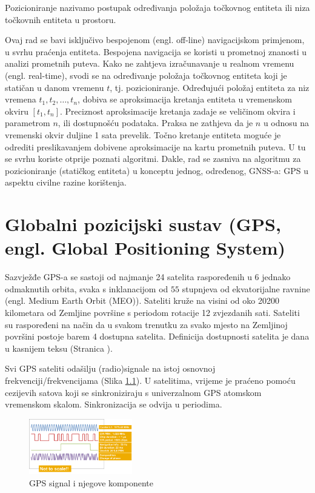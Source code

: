 \documentclass[a4paper,twoside,12pt]{memoir} %
\begin{document}
\begin{intro}
	\begin{defn}[Pozicioniranje]
		Pozicioniranje nazivamo postupak određivanja položaja točkovnog entiteta ili niza 
		točkovnih entiteta u prostoru.
	\end{defn}
	Ovaj rad se bavi isključivo bespojenom (engl. off-line) navigacijskom primjenom, u svrhu praćenja entiteta.
	Bespojena navigacija se koristi u prometnoj znanosti u analizi prometnih puteva. Kako ne zahtjeva izračunavanje u realnom vremenu (engl. real-time),
	svodi se na određivanje položaja točkovnog entiteta koji je statičan u danom vremenu $t$, tj. pozicioniranje.
	Određujući položaj entiteta za niz vremena $ t_1,t_2, \hdots ,t_n $, dobiva se 
	aproksimacija kretanja entiteta u vremenskom okviru $[t_1,t_n]$.
	Preciznost aproksimacije kretanja zadaje se veličinom okvira i parametrom $n$, ili dostupnošću podataka.
	Praksa ne zathjeva da je $n$ u odnosu na vremenski okvir duljine 1 sata prevelik.
	Točno kretanje entiteta moguće je
	odrediti preslikavanjem dobivene aproksimacije na kartu prometnih puteva.
	U tu se svrhu koriste otprije poznati algoritmi.
	Dakle, rad se zasniva na algoritmu za pozicioniranje (statičkog entiteta)
	u konceptu jednog, određenog, GNSS-a: GPS u aspektu civilne razine korištenja.
	
\end{intro}
	
\chapter[Globalni pozicijski sustav (GPS)][GPS]{Globalni pozicijski sustav (GPS, engl. Global Positioning System)}
	Sazvježđe GPS-a se sastoji od najmanje 24 satelita raspoređenih u 6 jednako odmaknutih orbita, svaka s inklanacijom od $55$ stupnjeva od ekvatorijalne
	ravnine (engl. Medium Earth Orbit (MEO)).
	Sateliti kruže na visini od oko 20200 kilometara od Zemljine površine s periodom rotacije 12 zvjezdanih sati. 
	Sateliti su raspoređeni na način da u svakom trenutku za svako mjesto na Zemljinoj površini postoje barem 4 dostupna satelita. Definicija dostupnosti satelita je dana u kasnijem teksu (Stranica \pageref{stranica:dostupnost}).
	
	Svi GPS sateliti odašilju (radio)signale na istoj osnovnoj frekvenciji/frekvencijama (Slika \ref{Fig:GPSSignal}). 
	U satelitima, vrijeme je praćeno pomoću cezijevih satova koji se sinkroniziraju s univerzalnom GPS atomskom vremenskom skalom. Sinkronizacija se odvija u periodima.
	\begin{figure}[H]
		\centering
		\includegraphics[width=0.4\textwidth]{GPS_Signals}
		\caption{GPS signal i njegove komponente \cite{GPS:1}}
		\label{Fig:GPSSignal}
	\end{figure}
	
\end{document}
